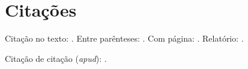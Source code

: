 \documentclass[12pt,a4paper]{article}
\begin{document}
\section*{Citações}

Citação no texto: \citet{book-example}. Entre parênteses: \citep{article-example}.
Com página: \citep[p.~45]{book-example}. Relatório: \citet{techreport-exampleIn}.

Citação de citação (\emph{apud}):
.

\nocite{*}
\printbibliography[title={Referências}]
\end{document}
